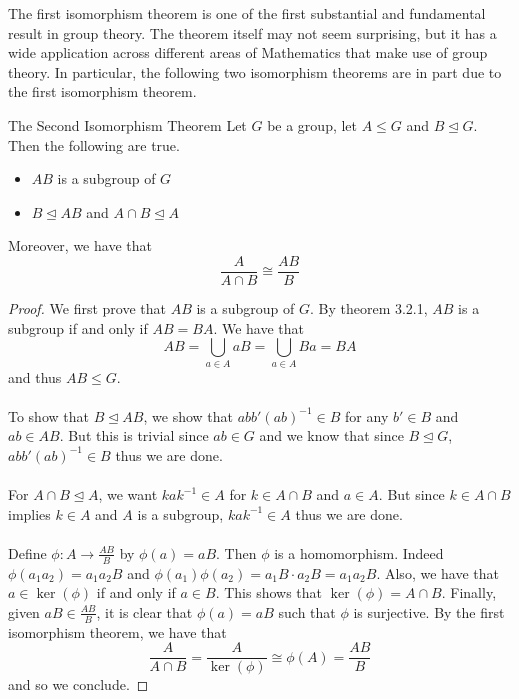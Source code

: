 \documentclass[a4paper]{article}
\begin{document}
The first isomorphism theorem is one of the first substantial and fundamental result in group theory. The theorem itself may not seem surprising, but it has a wide application across different areas of Mathematics that make use of group theory. In particular, the following two isomorphism theorems are in part due to the first isomorphism theorem. 

\begin{thm}{The Second Isomorphism Theorem}{} Let $G$ be a group, let $A\leq G$ and $B\trianglelefteq G$. Then the following are true. 
\begin{itemize}
\item $AB$ is a subgroup of $G$
\item $B\trianglelefteq AB$ and $A\cap B\trianglelefteq A$
\end{itemize} 
Moreover, we have that $$\frac{A}{A\cap B}\cong\frac{AB}{B}$$ \tcbline
\begin{proof}
We first prove that $AB$ is a subgroup of $G$. By theorem 3.2.1, $AB$ is a subgroup if and only if $AB=BA$. We have that $$AB=\bigcup_{a\in A}aB=\bigcup_{a\in A}Ba=BA$$ and thus $AB\leq G$. \\~\\
To show that $B\trianglelefteq AB$, we show that $abb'(ab)^{-1}\in B$ for any $b'\in B$ and $ab\in AB$. But this is trivial since $ab\in G$ and we know that since $B\trianglelefteq G$, $abb'(ab)^{-1}\in B$ thus we are done. \\~\\
For $A\cap B\trianglelefteq A$, we want $kak^{-1}\in A$ for $k\in A\cap B$ and $a\in A$. But since $k\in A\cap B$ implies $k\in A$ and $A$ is a subgroup, $kak^{-1}\in A$ thus we are done. \\~\\

Define $\phi:A\to\frac{AB}{B}$ by $\phi(a)=aB$. Then $\phi$ is a homomorphism. Indeed $\phi(a_1a_2)=a_1a_2B$ and $\phi(a_1)\phi(a_2)=a_1B\cdot a_2B=a_1a_2B$. Also, we have that $a\in\ker(\phi)$ if and only if $a\in B$. This shows that $\ker(\phi)=A\cap B$. Finally, given $aB\in\frac{AB}{B}$, it is clear that $\phi(a)=aB$ such that $\phi$ is surjective. By the first isomorphism theorem, we have that $$\frac{A}{A\cap B}=\frac{A}{\ker(\phi)}\cong\phi(A)=\frac{AB}{B}$$ and so we conclude. 
\end{proof}
\end{thm}
\end{document}
